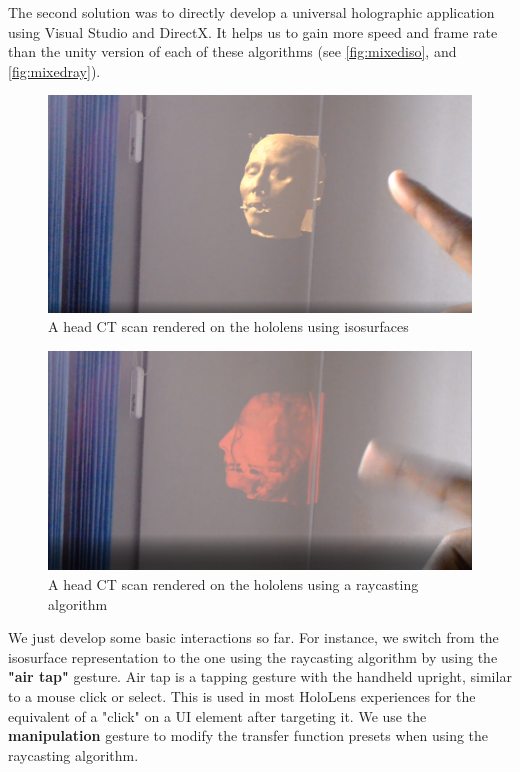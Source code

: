 The second solution was to directly develop a universal holographic application using Visual Studio and DirectX. It helps us to gain more speed and frame rate than the unity version of each of these algorithms (see \autoref{fig:mixediso}, and \autoref{fig:mixedray}). 

\begin{figure}
\centering
\includegraphics [width=\textwidth]{Figures/mixediso}
\caption{A head CT scan rendered on the hololens using isosurfaces }
\label{fig:mixediso}
\end{figure}


\begin{figure}
\centering
\includegraphics [width=\textwidth]{Figures/mixedray}
\caption{A head CT scan rendered on the hololens using a raycasting algorithm }
\label{fig:mixedray}
\end{figure}

We just develop some basic interactions so far. For instance, we switch from the isosurface representation to the one using the raycasting algorithm by using the \textbf{"air tap"} gesture. Air tap is a tapping gesture with the handheld upright, similar to a mouse click or select. This is used in most HoloLens experiences for the equivalent of a "click" on a UI element after targeting it.  We use the \textbf{manipulation} gesture to modify the transfer function presets when using the raycasting algorithm.

